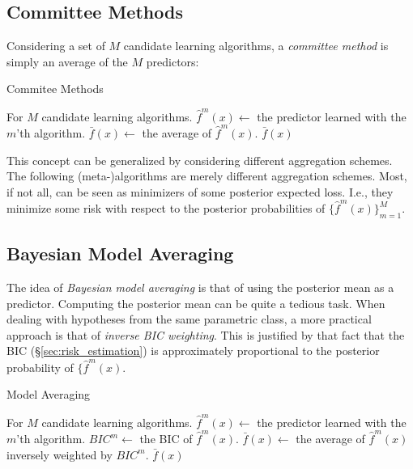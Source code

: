 \documentclass[12pt,a4paper]{article}
\theoremstyle{plain}
\theoremstyle{definition}
\newcommand{\hyp}{f}
\newcommand{\ensembleSize}{M}
\newcommand{\ensembleInd}{m}
\begin{document}
\subsection{Committee Methods}
Considering a set of $\ensembleSize$ candidate learning algorithms, a \emph{committee method} is simply an average of the $\ensembleSize$ predictors:

\begin{algorithm}[H]
\caption{Commitee Methods}
\label{algo:committee}
\begin{algorithmic}
\State For $\ensembleSize$ candidate learning algorithms.
\For{$ \ensembleInd \in 1,\dots,\ensembleSize$}
	\State $\hat{\hyp}^\ensembleInd(x) \gets$ the predictor learned with the $\ensembleInd$'th algorithm.
\EndFor
\State $\bar{\hyp}(x) \gets$ the average of $\hat{\hyp}^\ensembleInd(x)$. 
\State \Return $\bar{\hyp}(x)$
\end{algorithmic}
\end{algorithm}

This concept can be generalized by considering different aggregation schemes. The following (meta-)algorithms are merely different aggregation schemes. Most, if not all, can be seen as minimizers of some posterior expected loss. I.e., they minimize some risk with respect to the posterior probabilities of $\{\hat{\hyp}^\ensembleInd(x) \}_{\ensembleInd=1}^\ensembleSize $.


\subsection{Bayesian Model Averaging}
The idea of \emph{Bayesian model averaging} is that of using the posterior mean as a predictor. 
Computing the posterior mean can be quite a tedious task. 
When dealing with hypotheses from the same parametric class, a more practical approach is that of \emph{inverse BIC weighting}. 
This is justified by that fact that the BIC (\S\ref{sec:risk_estimation}) is approximately proportional to the posterior probability of $\{\hat{\hyp}^\ensembleInd(x)$.


\begin{algorithm}[H]
\caption{Model Averaging}
\label{algo:model_averaging}
\begin{algorithmic}
\State For $\ensembleSize$ candidate learning algorithms.
\For{$ \ensembleInd \in 1,\dots,\ensembleSize$}
	\State $\hat{\hyp}^\ensembleInd(x) \gets$ the predictor learned with the $\ensembleInd$'th algorithm.
	\State $BIC^\ensembleInd \gets$ the BIC of $\hat{\hyp}^\ensembleInd(x)$.
\EndFor
\State $\bar{\hyp}(x) \gets$ the average of $\hat{\hyp}^\ensembleInd(x)$ inversely weighted by $BIC^\ensembleInd$. 
\State \Return $\bar{\hyp}(x)$
\end{algorithmic}
\end{algorithm}
\end{document}
